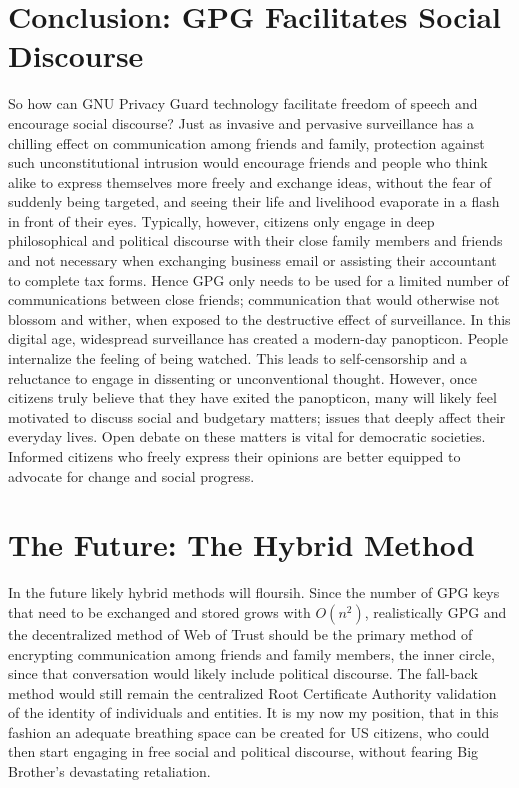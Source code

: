 \documentclass[twoside,twocolumn]{article}
\begin{document}
\vspace{-6mm}

\section*{Conclusion: GPG Facilitates Social Discourse}
So how can GNU Privacy Guard technology facilitate freedom of speech and encourage social discourse?
Just as invasive and pervasive surveillance has a chilling effect on communication among friends and family,
protection against such unconstitutional intrusion would encourage friends and people who think alike to express themselves more freely
and exchange ideas, without the fear of suddenly being targeted, and seeing their life and livelihood evaporate in a flash in front of their eyes.
Typically, however, citizens only engage in deep philosophical and political discourse with their close family members and friends and not necessary
when exchanging business email or assisting their accountant to complete tax forms.
Hence GPG only needs to be used for a limited number of communications between close friends;
communication that would otherwise not blossom and wither, when exposed to the destructive effect of surveillance.
In this digital age, widespread surveillance has created a modern-day panopticon.
People internalize the feeling of being watched. This leads to self-censorship and a reluctance to engage in dissenting or unconventional thought.
However, once citizens truly believe that they have exited the panopticon,
many will likely feel motivated to discuss social and budgetary matters;
issues that deeply affect their everyday lives.
Open debate on these matters is vital for democratic societies.
Informed citizens who freely express their opinions are better equipped to advocate for change and social progress\cite{yale}.


\section*{The Future: The Hybrid Method}
In the future likely hybrid methods will floursih.
Since the number of GPG keys that need to be exchanged and stored
grows with $O(n^2)$, realistically GPG and
the decentralized method of Web of Trust
should be the primary method of encrypting communication among friends and family members,
the inner circle,
since that conversation would likely include political discourse.
The fall-back method would still remain the centralized Root Certificate Authority validation of the identity of individuals and entities.
It is my now my position, that in this fashion an adequate breathing space can be created for US citizens,
who could then start engaging in free social and political discourse,
without fearing Big Brother's\cite{1984} devastating retaliation\cite{1984b}.
\end{document}
